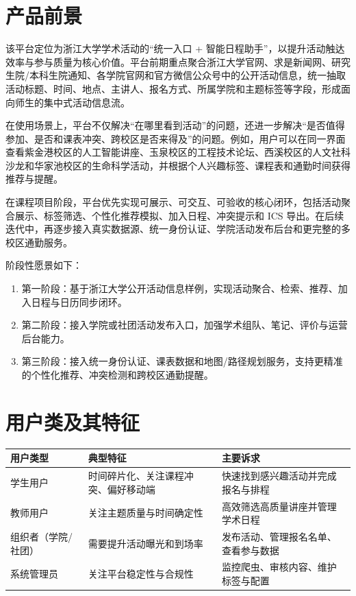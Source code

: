 \documentclass[UTF8,a4paper,12pt,fontset=none]{ctexrep}
\begin{document}
\section{产品前景}

该平台定位为浙江大学学术活动的“统一入口 + 智能日程助手”，以提升活动触达效率与参与质量为核心价值。平台前期重点聚合浙江大学官网、求是新闻网、研究生院/本科生院通知、各学院官网和官方微信公众号中的公开活动信息，统一抽取活动标题、时间、地点、主讲人、报名方式、所属学院和主题标签等字段，形成面向师生的集中式活动信息流。

在使用场景上，平台不仅解决“在哪里看到活动”的问题，还进一步解决“是否值得参加、是否和课表冲突、跨校区是否来得及”的问题。例如，用户可以在同一界面查看紫金港校区的人工智能讲座、玉泉校区的工程技术论坛、西溪校区的人文社科沙龙和华家池校区的生命科学活动，并根据个人兴趣标签、课程表和通勤时间获得推荐与提醒。

在课程项目阶段，平台优先实现可展示、可交互、可验收的核心闭环，包括活动聚合展示、标签筛选、个性化推荐模拟、加入日程、冲突提示和 ICS 导出。在后续迭代中，再逐步接入真实数据源、统一身份认证、学院活动发布后台和更完整的多校区通勤服务。

阶段性愿景如下：

\begin{enumerate}[leftmargin=2.5em]
\item 第一阶段：基于浙江大学公开活动信息样例，实现活动聚合、检索、推荐、加入日程与日历同步闭环。
\item 第二阶段：接入学院或社团活动发布入口，加强学术组队、笔记、评价与运营后台能力。
\item 第三阶段：接入统一身份认证、课表数据和地图/路径规划服务，支持更精准的个性化推荐、冲突检测和跨校区通勤提醒。
\end{enumerate}

\section{用户类及其特征}

\begingroup
\small
\begin{longtable}{|>{\raggedright\arraybackslash}p{}|>{\raggedright\arraybackslash}p{}|>{\raggedright\arraybackslash}p{}|}
\hline
\textbf{用户类型} & \textbf{典型特征} & \textbf{主要诉求} \\
\hline
学生用户 & 时间碎片化、关注课程冲突、偏好移动端 & 快速找到感兴趣活动并完成报名与排程 \\
\hline
教师用户 & 关注主题质量与时间确定性 & 高效筛选高质量讲座并管理学术日程 \\
\hline
组织者（学院/社团） & 需要提升活动曝光和到场率 & 发布活动、管理报名名单、查看参与数据 \\
\hline
系统管理员 & 关注平台稳定性与合规性 & 监控爬虫、审核内容、维护标签与配置 \\
\hline
\end{longtable}
\endgroup
\end{document}
